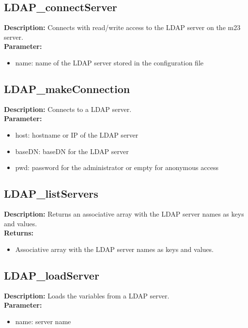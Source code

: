 \subsection{LDAP\_connectServer}
\textbf{Description:} Connects with read/write access to the LDAP server on the m23 server.\\
\textbf{Parameter:}
\begin{itemize}
\item name: name of the LDAP server stored in the configuration file
\end{itemize}

\subsection{LDAP\_makeConnection}
\textbf{Description:} Connects to a LDAP server.\\
\textbf{Parameter:}
\begin{itemize}
\item host: hostname or IP of the LDAP server
\item baseDN: baseDN for the LDAP server
\item pwd: password for the administrator or empty for anonymous access
\end{itemize}

\subsection{LDAP\_listServers}
\textbf{Description:} Returns an associative array with the LDAP server names as keys and values.\\
\textbf{Returns:}
\begin{itemize}
\item Associative array with the LDAP server names as keys and values.
\end{itemize}

\subsection{LDAP\_loadServer}
\textbf{Description:} Loads the variables from a LDAP server.\\
\textbf{Parameter:}
\begin{itemize}
\item name: server name
\end{itemize}

